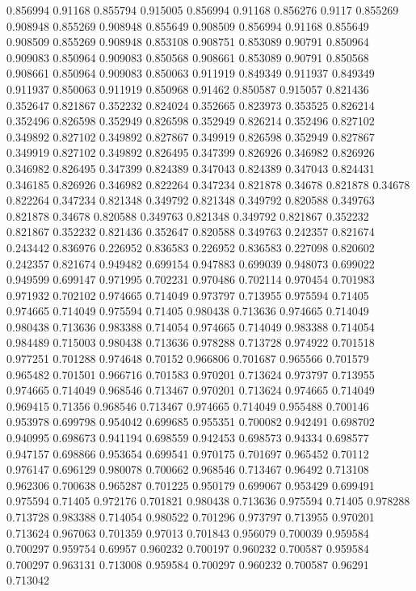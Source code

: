0.856994 0.91168
0.855794 0.915005
0.856994 0.91168
0.856276 0.9117
0.855269 0.908948
0.855269 0.908948
0.855649 0.908509
0.856994 0.91168
0.855649 0.908509
0.855269 0.908948
0.853108 0.908751
0.853089 0.90791
0.850964 0.909083
0.850964 0.909083
0.850568 0.908661
0.853089 0.90791
0.850568 0.908661
0.850964 0.909083
0.850063 0.911919
0.849349 0.911937
0.849349 0.911937
0.850063 0.911919
0.850968 0.91462
0.850587 0.915057
0.821436 0.352647
0.821867 0.352232
0.824024 0.352665
0.823973 0.353525
0.826214 0.352496
0.826598 0.352949
0.826598 0.352949
0.826214 0.352496
0.827102 0.349892
0.827102 0.349892
0.827867 0.349919
0.826598 0.352949
0.827867 0.349919
0.827102 0.349892
0.826495 0.347399
0.826926 0.346982
0.826926 0.346982
0.826495 0.347399
0.824389 0.347043
0.824389 0.347043
0.824431 0.346185
0.826926 0.346982
0.822264 0.347234
0.821878 0.34678
0.821878 0.34678
0.822264 0.347234
0.821348 0.349792
0.821348 0.349792
0.820588 0.349763
0.821878 0.34678
0.820588 0.349763
0.821348 0.349792
0.821867 0.352232
0.821867 0.352232
0.821436 0.352647
0.820588 0.349763
0.242357 0.821674
0.243442 0.836976
0.226952 0.836583
0.226952 0.836583
0.227098 0.820602
0.242357 0.821674
0.949482 0.699154
0.947883 0.699039
0.948073 0.699022
0.949599 0.699147
0.971995 0.702231
0.970486 0.702114
0.970454 0.701983
0.971932 0.702102
0.974665 0.714049
0.973797 0.713955
0.975594 0.71405
0.974665 0.714049
0.975594 0.71405
0.980438 0.713636
0.974665 0.714049
0.980438 0.713636
0.983388 0.714054
0.974665 0.714049
0.983388 0.714054
0.984489 0.715003
0.980438 0.713636
0.978288 0.713728
0.974922 0.701518
0.977251 0.701288
0.974648 0.70152
0.966806 0.701687
0.965566 0.701579
0.965482 0.701501
0.966716 0.701583
0.970201 0.713624
0.973797 0.713955
0.974665 0.714049
0.968546 0.713467
0.970201 0.713624
0.974665 0.714049
0.969415 0.71356
0.968546 0.713467
0.974665 0.714049
0.955488 0.700146
0.953978 0.699798
0.954042 0.699685
0.955351 0.700082
0.942491 0.698702
0.940995 0.698673
0.941194 0.698559
0.942453 0.698573
0.94334 0.698577
0.947157 0.698866
0.953654 0.699541
0.970175 0.701697
0.965452 0.70112
0.976147 0.696129
0.980078 0.700662
0.968546 0.713467
0.96492 0.713108
0.962306 0.700638
0.965287 0.701225
0.950179 0.699067
0.953429 0.699491
0.975594 0.71405
0.972176 0.701821
0.980438 0.713636
0.975594 0.71405
0.978288 0.713728
0.983388 0.714054
0.980522 0.701296
0.973797 0.713955
0.970201 0.713624
0.967063 0.701359
0.97013 0.701843
0.956079 0.700039
0.959584 0.700297
0.959754 0.69957
0.960232 0.700197
0.960232 0.700587
0.959584 0.700297
0.963131 0.713008
0.959584 0.700297
0.960232 0.700587
0.96291 0.713042
